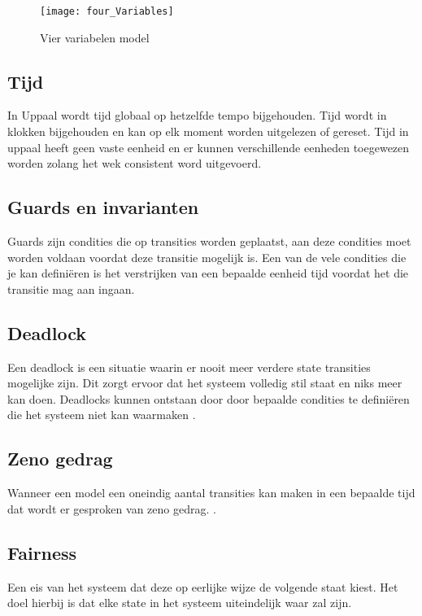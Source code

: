 \begin{figure}[!h]
	\centering
	\texttt{[image: four\_Variables]}
    \caption{Vier variabelen model \cite{thompson2000requirements}}
	\label{fig:four_Variables}
\end{figure}

\subsection{Tijd}
In Uppaal wordt tijd globaal op hetzelfde tempo bijgehouden. Tijd wordt in klokken bijgehouden en kan op elk moment worden uitgelezen of gereset. Tijd in uppaal heeft geen vaste eenheid en er kunnen verschillende eenheden toegewezen worden zolang het wek consistent word uitgevoerd. \cite{uppaalsmalltutorial}
\subsection{Guards en invarianten}
Guards zijn condities die op transities worden geplaatst, aan deze condities moet worden voldaan voordat deze transitie mogelijk is. Een van de vele condities die je kan definiëren is het verstrijken van een bepaalde eenheid tijd voordat het die transitie mag aan ingaan. \cite{uppaalsmalltutorial}

\subsection{Deadlock} \label{deadlock}

Een deadlock is een situatie waarin er nooit meer verdere state transities mogelijke zijn. Dit zorgt ervoor dat het systeem volledig stil staat en niks meer kan doen. Deadlocks kunnen ontstaan door door bepaalde condities te definiëren die het systeem niet kan waarmaken \cite{uppaalintro}.

\subsection{Zeno gedrag} \label{zenobehavior}
Wanneer een model een oneindig aantal transities kan maken in een bepaalde tijd dat wordt er gesproken van zeno gedrag. \cite{uppaaltutorialmodelingpatterns} \cite{leine2011zeno}.

\subsection{Fairness}

Een eis van het systeem dat deze op eerlijke wijze de volgende staat kiest. Het doel hierbij is dat elke state in het systeem uiteindelijk waar zal zijn.

